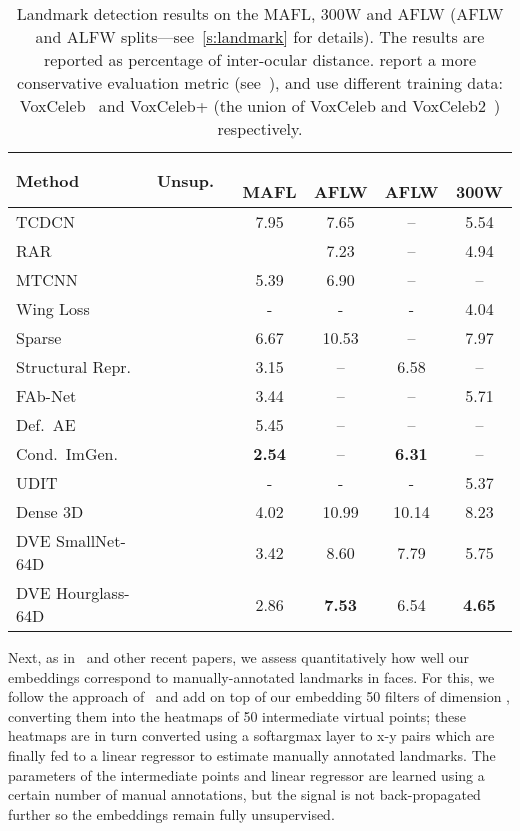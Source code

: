 \documentclass[10pt,twocolumn,letterpaper]{article}
\begin{document}
\begin{table}[t]
\setlength\tabcolsep{1pt}
\centering

\begin{tabular}{l@{\hskip -0.3cm}c@{\hskip -0.1cm}cccc}
\toprule
Method                      & Unsup.\ \,      & \,MAFL    & \,AFLW & \,AFLW     & \,\,300W  \\
\midrule
TCDCN~\cite{Zhang2016}      &      & 7.95    &  7.65  & --        & 5.54  \\
RAR~\cite{Xiao2016}         &      &         & 7.23 & -- & 4.94  \\
MTCNN~\cite{zhang2014facial,zhang2018unsupervised}  &      &   5.39  & 6.90  & --  &  -- \\
Wing Loss~\cite{feng2018wing}    &      &   -  & -  & -  &  4.04 \\                                                                       
\midrule
Sparse~\cite{thewlis17unsupervised}  &  & 6.67 &  10.53 & -- & 7.97 \\
Structural Repr.~\cite{zhang2018unsupervised} &  & 3.15 & -- & 6.58 & -- \\
FAb-Net~\cite{Wiles18a} &   & 3.44 & -- & -- & 5.71\\
Def.~AE~\cite{shu2018deforming} &  & 5.45 & -- & --  & --\\
Cond.~ImGen.~\cite{jakab2018unsupervised} &  & \textbf{2.54} & -- & \textbf{6.31}  & --\\
UDIT~\cite{jakab2019learning} &  & - & - & - & 5.37 \\
Dense 3D~\cite{thewlis17Bunsupervised} &  & 4.02 & 10.99 & 10.14 & 8.23\\
DVE SmallNet-64D  &                   & 3.42 & 8.60 & 7.79 & 5.75  \\
DVE Hourglass-64D  &  & 2.86 & \textbf{7.53} & 6.54 & \textbf{4.65}  \\
\bottomrule
\end{tabular}
\medskip
\caption{Landmark detection results on the MAFL, 300W and AFLW (AFLW and ALFW splits---see~\cref{s:landmark} for details). The results are reported as percentage of inter-ocular distance.  report a more conservative evaluation metric (see~\cite{feng2018wing}),   and  use different training data: VoxCeleb~\cite{Nagrani17} and VoxCeleb+ (the union of VoxCeleb and VoxCeleb2~\cite{Chung18b}) respectively.
\label{t:landmark}}
\end{table}


Next, as in~\cite{thewlis17Bunsupervised} and other recent papers, we assess quantitatively how well our embeddings correspond to manually-annotated landmarks in faces.
For this, we follow the approach of~\cite{thewlis17Bunsupervised} and add on top of our embedding 50 filters of dimension , converting them into the heatmaps of 50 intermediate virtual points; these heatmaps are in turn converted using a softargmax layer to  x-y pairs which are finally fed to a linear regressor to estimate manually annotated landmarks.
The parameters of the intermediate points and linear regressor are learned using a certain number of manual annotations, but the signal is not back-propagated further so the embeddings remain fully unsupervised.
\end{document}
